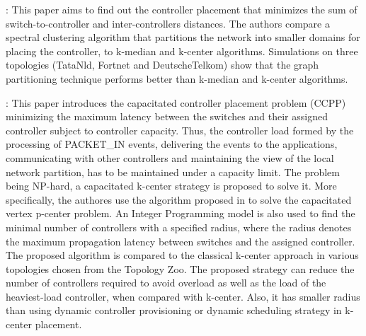 \documentclass[a4paper,10pt]{article}
\begin{document}



\cite{SaSa16}: This paper aims to find out the controller placement that minimizes the sum of switch-to-controller and inter-controllers distances. The authors compare a spectral clustering algorithm that partitions the network into smaller domains for placing the controller, to k-median and k-center algorithms. Simulations on three topologies (TataNld, Fortnet and DeutscheTelkom) show that the graph partitioning technique performs better than k-median and k-center algorithms. 


\cite{YaBi14}: This paper introduces the capacitated controller placement problem (CCPP) minimizing the maximum latency between the switches and their assigned controller subject to controller capacity. Thus, the controller load formed by the processing of PACKET\_IN events, delivering the events to the applications, communicating with other controllers and maintaining the view of the local network partition, has to be maintained under a capacity limit.
The problem being NP-hard, a capacitated k-center strategy is proposed to solve it. More specifically, the authores use the algorithm proposed in \cite{OzPi06} to solve the capacitated vertex p-center problem. An Integer Programming model is also used to find the minimal number of controllers with a specified radius, where the radius denotes the maximum propagation latency between switches and the assigned controller. The proposed algorithm is compared to the classical k-center approach in various topologies chosen from the Topology Zoo. The proposed strategy can reduce the number of controllers required to avoid overload as well as the load of the heaviest-load controller, when compared with k-center. Also, it has smaller radius than using dynamic controller provisioning or dynamic scheduling strategy in k-center placement. 


\end{document}
